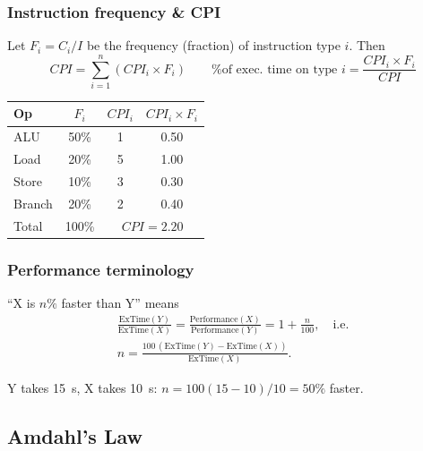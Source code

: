 \subsubsection{Instruction frequency \& CPI}
\begin{prop}
Let $F_i = C_i / I$ be the frequency (fraction) of instruction type $i$.
Then
\[
  CPI = \sum_{i=1}^n \left(CPI_i \times F_i\right)
  \qquad \text{\% of exec.\ time on type } i = \frac{CPI_i \times F_i}{CPI}
\]
\end{prop}

\begin{eg}
\leavevmode
\begin{center}
\begin{tabular}{@{}lccc@{}}
\toprule
Op & $F_i$ & $CPI_i$ & $CPI_i \times F_i$ \\
\midrule
ALU    & 50\% & 1 & 0.50 \\
Load   & 20\% & 5 & 1.00 \\
Store  & 10\% & 3 & 0.30 \\
Branch & 20\% & 2 & 0.40 \\
\midrule
Total  & 100\% & \multicolumn{2}{c}{$CPI = 2.20$} \\
\bottomrule
\end{tabular}
\end{center}
\end{eg}

\subsubsection{Performance terminology}
\begin{definition}[``$n\%$ faster'']
``X is $n\%$ faster than Y'' means
\begin{gather*}
  \frac{\text{ExTime}(Y)}{\text{ExTime}(X)} = \frac{\text{Performance}(X)}
  {\text{Performance}(Y)} = 1 + \frac{n}{100},
  \quad\text{i.e.}\\
  n = \frac{100\,(\text{ExTime}(Y) - \text{ExTime}(X))}{\text{ExTime}(X)}.
\end{gather*}
\end{definition}
\begin{eg}
Y takes 15~s, X takes 10~s: $n = 100(15-10)/10 = 50\%$ faster.
\end{eg}

\subsection{Amdahl's Law}

